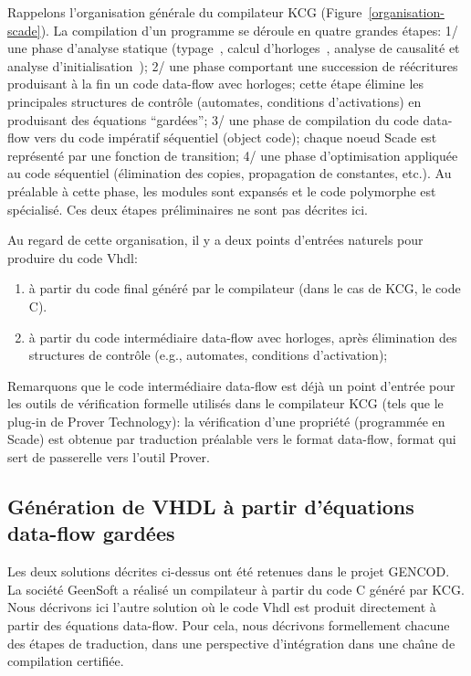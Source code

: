 \documentclass[a4paper]{article}
\newcommand{\scade}{{\sc Scade}}
\newcommand{\vhdl}{{\sc Vhdl}}
\begin{document}
Rappelons l'organisation g\'en\'erale du compilateur KCG
(Figure~\ref{organisation-scade}).  La compilation d'un programme se
d\'eroule en quatre grandes \'etapes: 1/ une phase d'analyse statique
(typage~\cite{lucy:emsoft03}, calcul d'horloges~\cite{lucy:emsoft04},
analyse de causalit\'e et analyse d'initialisation~\cite{lucy:sttt04});
2/ une phase comportant une succession de r\'e\'ecritures produisant \`a la
fin un code data-flow avec horloges; cette \'etape \'elimine les
principales structures de contr\^ole (automates, conditions
d'activations) en produisant des \'equations ``gard\'ees''; 3/ une phase
de compilation du code data-flow vers du code imp\'eratif s\'equentiel
(object code); chaque noeud \scade{} est repr\'esent\'e par une fonction
de transition; 4/ une phase d'optimisation appliqu\'ee au code
s\'equentiel (\'elimination des copies, propagation de constantes,
etc.). Au pr\'ealable \`a cette phase, les modules sont expans\'es et le
code polymorphe est sp\'ecialis\'e. Ces deux \'etapes pr\'eliminaires ne sont
pas d\'ecrites ici.

Au regard de cette organisation, il y a deux points d'entr\'ees naturels
pour produire du code \vhdl{}:
\begin{enumerate}
\item
\`a partir du code final g\'en\'er\'e par le compilateur (dans le cas de KCG, le
code C).
\item \`a partir du code interm\'ediaire data-flow avec horloges, apr\`es
  \'elimination des structures de contr\^ole (e.g., automates, conditions
  d'activation);
\end{enumerate}

Remarquons que le code interm\'ediaire data-flow est d\'ej\`a un point
d'entr\'ee pour les outils de v\'erification formelle utilis\'es dans le
compilateur KCG (tels que le plug-in de Prover Technology): la
v\'erification d'une propri\'et\'e (programm\'ee en \scade) est obtenue par
traduction pr\'ealable vers le format data-flow, format qui sert de
passerelle vers l'outil Prover.

\subsection{G\'en\'eration de VHDL \`a partir d'\'equations data-flow gard\'ees}
Les deux solutions d\'ecrites ci-dessus ont \'et\'e retenues dans le projet
GENCOD. La soci\'et\'e GeenSoft a r\'ealis\'e un compilateur \`a partir du code
C g\'en\'er\'e par KCG. Nous d\'ecrivons ici l'autre solution o\`u le code
\vhdl{} est produit directement \`a partir des \'equations data-flow. Pour cela,
nous d\'ecrivons formellement chacune des \'etapes de traduction, dans une
perspective d'int\'egration dans une cha\^{\i}ne de compilation certifi\'ee.
\end{document}
